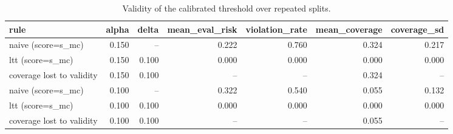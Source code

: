 \begin{table}[t]
\centering
\caption{Validity of the calibrated threshold over repeated splits.}
\label{tab:calib}
\begin{tabular}{lrrrrrr}
\toprule
rule & alpha & delta & mean\_eval\_risk & violation\_rate & mean\_coverage & coverage\_sd \\
\midrule
naive (score=s\_mc) & 0.150 & -- & 0.222 & 0.760 & 0.324 & 0.217 \\
ltt (score=s\_mc) & 0.150 & 0.100 & 0.000 & 0.000 & 0.000 & 0.000 \\
coverage lost to validity & 0.150 & 0.100 & -- & -- & 0.324 & -- \\
naive (score=s\_mc) & 0.100 & -- & 0.322 & 0.540 & 0.055 & 0.132 \\
ltt (score=s\_mc) & 0.100 & 0.100 & 0.000 & 0.000 & 0.000 & 0.000 \\
coverage lost to validity & 0.100 & 0.100 & -- & -- & 0.055 & -- \\
\bottomrule
\end{tabular}
\end{table}